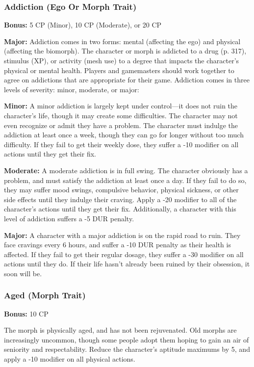 \subsubsection{Addiction (Ego Or Morph Trait)}
\textbf{Bonus:} 5 CP (Minor), 10 CP (Moderate), or 20 CP

\textbf{Major:} Addiction comes in two forms: mental (affecting the ego) and
physical (affecting the biomorph). The character or morph is addicted to a drug
(p. 317), stimulus (XP), or activity (mesh use) to a degree that impacts the
character’s physical or mental health.  Players and gamemasters should work
together to agree on addictions that are appropriate for their game. Addiction
comes in three levels of severity: minor, moderate, or major:

\textbf{Minor:} A minor addiction is largely kept under control—it does not
ruin the character’s life, though it may create some difficulties. The
character may not even recognize or admit they have a problem. The character
must indulge the addiction at least once a week, though they can go for longer
without too much difficulty. If they fail to get their weekly dose, they suffer
a -10 modifier on all actions until they get their fix.

\textbf{Moderate:} A moderate addiction is in full swing.  The character
obviously has a problem, and must satisfy the addiction at least once a day. If
they fail to do so, they may suffer mood swings, compulsive behavior, physical
sickness, or other side effects until they indulge their craving. Apply a -20
modifier to all of the character’s actions until they get their fix.
Additionally, a character with this level of addiction suffers a -5 DUR
penalty.

\textbf{Major:} A character with a major addiction is on the rapid road to
ruin. They face cravings every 6 hours, and suffer a -10 DUR penalty as their
health is affected. If they fail to get their regular dosage, they suffer a -30
modifier on all actions until they do. If their life hasn’t already been ruined
by their obsession, it soon will be.

\subsubsection{Aged (Morph Trait)}
\textbf{Bonus:} 10 CP

The morph is physically aged, and has not been rejuvenated. Old morphs are
increasingly uncommon, though some people adopt them hoping to gain an air of
seniority and respectability. Reduce the character’s aptitude maximums by 5,
and apply a -10 modifier on all physical actions.

